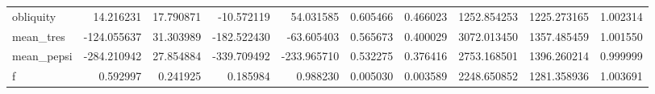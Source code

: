 \begin{tabular}{lrrrrrrrrr}
obliquity     &   14.216231 &  17.790871 &  -10.572119 &   54.031585 &   0.605466 &  0.466023 &  1252.854253 &  1225.273165 &  1.002314 \\
mean\_tres     & -124.055637 &  31.303989 & -182.522430 &  -63.605403 &   0.565673 &  0.400029 &  3072.013450 &  1357.485459 &  1.001550 \\
mean\_pepsi    & -284.210942 &  27.854884 & -339.709492 & -233.965710 &   0.532275 &  0.376416 &  2753.168501 &  1396.260214 &  0.999999 \\
f             &    0.592997 &   0.241925 &    0.185984 &    0.988230 &   0.005030 &  0.003589 &  2248.650852 &  1281.358936 &  1.003691 \\
\bottomrule
\end{tabular}
